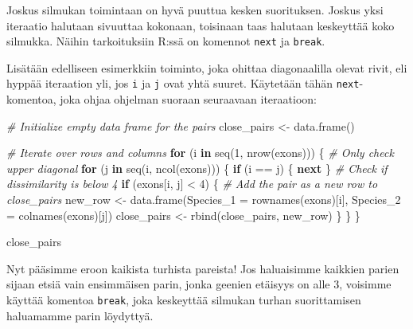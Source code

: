 \documentclass[
]{book}
\newenvironment{Shaded}{\begin{snugshade}}{\end{snugshade}}
\newcommand{\AttributeTok}[1]{\textcolor[rgb]{0.77,0.63,0.00}{#1}}
\newcommand{\CommentTok}[1]{\textcolor[rgb]{0.56,0.35,0.01}{\textit{#1}}}
\newcommand{\ControlFlowTok}[1]{\textcolor[rgb]{0.13,0.29,0.53}{\textbf{#1}}}
\newcommand{\DecValTok}[1]{\textcolor[rgb]{0.00,0.00,0.81}{#1}}
\newcommand{\FunctionTok}[1]{\textcolor[rgb]{0.00,0.00,0.00}{#1}}
\newcommand{\NormalTok}[1]{#1}
\newcommand{\OtherTok}[1]{\textcolor[rgb]{0.56,0.35,0.01}{#1}}
\newcommand{\SpecialCharTok}[1]{\textcolor[rgb]{0.00,0.00,0.00}{#1}}
\begin{document}
Joskus silmukan toimintaan on hyvä puuttua kesken suorituksen. Joskus yksi iteraatio halutaan sivuuttaa kokonaan, toisinaan taas halutaan keskeyttää koko silmukka. Näihin tarkoituksiin R:ssä on komennot \texttt{next} ja \texttt{break}.

Lisätään edelliseen esimerkkiin toiminto, joka ohittaa diagonaalilla olevat rivit, eli hyppää iteraation yli, jos \texttt{i} ja \texttt{j} ovat yhtä suuret. Käytetään tähän \texttt{next}-komentoa, joka ohjaa ohjelman suoraan seuraavaan iteraatioon:

\begin{Shaded}
\begin{Highlighting}[]
\CommentTok{\# Initialize empty data frame for the pairs}
\NormalTok{close\_pairs }\OtherTok{\textless{}{-}} \FunctionTok{data.frame}\NormalTok{()}

\CommentTok{\# Iterate over rows and columns}
\ControlFlowTok{for}\NormalTok{ (i }\ControlFlowTok{in} \FunctionTok{seq}\NormalTok{(}\DecValTok{1}\NormalTok{, }\FunctionTok{nrow}\NormalTok{(exons))) \{}
  \CommentTok{\# Only check upper diagonal}
  \ControlFlowTok{for}\NormalTok{ (j }\ControlFlowTok{in} \FunctionTok{seq}\NormalTok{(i, }\FunctionTok{ncol}\NormalTok{(exons))) \{}
    \ControlFlowTok{if}\NormalTok{ (i }\SpecialCharTok{==}\NormalTok{ j) \{}
       \ControlFlowTok{next}
\NormalTok{    \}}
    \CommentTok{\# Check if dissimilarity is below 4}
    \ControlFlowTok{if}\NormalTok{ (exons[i, j] }\SpecialCharTok{\textless{}} \DecValTok{4}\NormalTok{) \{}
      \CommentTok{\# Add the pair as a new row to close\_pairs}
\NormalTok{      new\_row }\OtherTok{\textless{}{-}} \FunctionTok{data.frame}\NormalTok{(}\AttributeTok{Species\_1 =} \FunctionTok{rownames}\NormalTok{(exons)[i],}
                            \AttributeTok{Species\_2 =} \FunctionTok{colnames}\NormalTok{(exons)[j])}
\NormalTok{      close\_pairs }\OtherTok{\textless{}{-}} \FunctionTok{rbind}\NormalTok{(close\_pairs,}
\NormalTok{                           new\_row)}
\NormalTok{    \}}
\NormalTok{  \}}
\NormalTok{\}}

\NormalTok{close\_pairs}
\end{Highlighting}
\end{Shaded}

Nyt pääsimme eroon kaikista turhista pareista! Jos haluaisimme kaikkien parien sijaan etsiä vain ensimmäisen parin, jonka geenien etäisyys on alle 3, voisimme käyttää komentoa \texttt{break}, joka keskeyttää silmukan turhan suorittamisen haluamamme parin löydyttyä.
\end{document}
